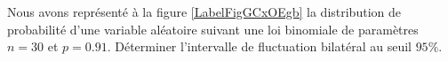 
\begin{exercice}\label{exosmath-0384}

    Nous avons représenté à la figure \ref{LabelFigGCxOEgb} la distribution de probabilité d'une variable aléatoire suivant une loi binomiale de paramètres \( n=30\) et \( p=0.91\). Déterminer l'intervalle de fluctuation bilatéral au seuil \( 95\%\).


\newcommand{\CaptionFigGCxOEgb}{La distribution des probabilités pour une variable aléatoire de paramètres \( n=30\) et \( p=0.91\).}



\end{exercice}
